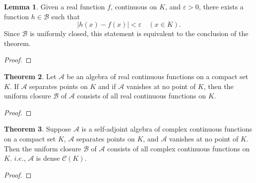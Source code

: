 \documentclass[12pt]{book}
\theoremstyle{definition}
\newtheorem{theorem}{Theorem}[chapter]
\newtheorem{lemma}[theorem]{Lemma}
\begin{document}
	\vfill
	\vfill
	\newpage
	\begin{lemma}
		Given a real function $f$, continuous on $K$, and $\varepsilon>0$, there exists a function $h\in\mathscr{B}$ such that $$|h(x)-f(x)|<\varepsilon\quad (x\in K).$$
		Since $\mathscr{B}$ is uniformly closed, this statement is equivalent to the conclusion of the theorem.
	\end{lemma}
	\begin{proof}
	\end{proof}
	\newpage
	\begin{theorem}
		Let $\mathscr{A}$ be an algebra of real continuous functions on a compact set $K$. If $\mathscr{A}$ separates points on $K$ and if $\mathscr{A}$ vanishes at no point of $K$, then the uniform closure $\mathscr{B}$ of $\mathscr{A}$ consists of all real continuous functions on $K$.
	\end{theorem}
	\begin{proof}
	\end{proof}
	\newpage
	\begin{theorem}
		Suppose $\mathscr{A}$ is a self-adjoint algebra of complex continuous functions on a compact set $K$, $\mathscr{A}$ separates points on $K$, and $\mathscr{A}$ vanishes at no point of $K$. Then the uniform closure $\mathscr{B}$ of $\mathscr{A}$ consists of all complex continuous functions on $K$. $i.e.$, $\mathscr{A}$ is dense $\mathscr{C}(K)$.
	\end{theorem}
	\begin{proof}
	\end{proof}
\end{document}
